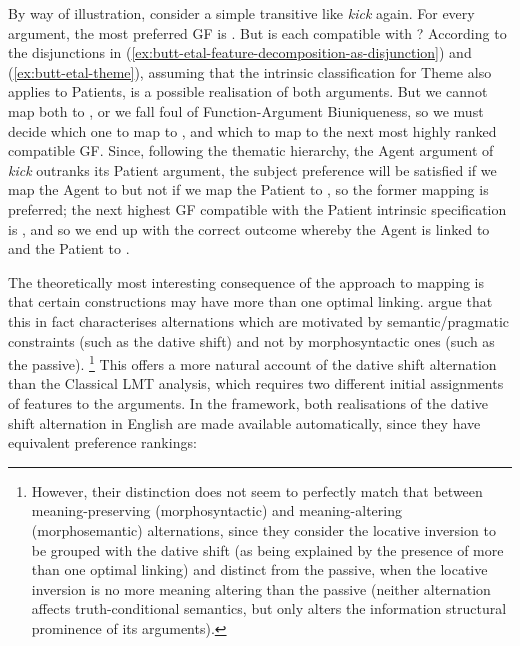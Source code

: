 \documentclass[output=paper]{langscibook}
\begin{document}
By way of illustration, consider a simple transitive like \textit{kick} again.
For every argument, the most preferred GF is \SUBJ. But is each compatible with
\SUBJ? According to the disjunctions in
(\ref{ex:butt-etal-feature-decomposition-as-disjunction}) and
(\ref{ex:butt-etal-theme}), assuming that the intrinsic classification for Theme
also applies to Patients, \SUBJ is a possible realisation of both arguments. But
we cannot map both to \SUBJ, or we fall foul of Function-Argument Biuniqueness,
so we must decide which one to map to \SUBJ, and which to map to the next most
highly ranked compatible GF. Since, following the thematic hierarchy, the Agent
argument of \textit{kick} outranks its Patient argument, the subject preference
will be satisfied if we map the Agent to \SUBJ but not if we map the Patient to
\SUBJ, so the former mapping is preferred; the next highest GF compatible with
the Patient intrinsic specification is \OBJ, and so we end up with the correct
outcome whereby the Agent is linked to \SUBJ and the Patient to \OBJ.

The theoretically most interesting consequence of the
\citet{butt1997architecture} approach to mapping is that certain constructions
may have more than one optimal linking. \citet[8ff.]{butt1997architecture} argue
that this in fact characterises alternations which are motivated by
semantic\slash pragmatic constraints (such as the dative shift) and not by
morphosyntactic ones (such as the passive).%
%
\footnote{However, their distinction does not seem to perfectly match that
  between meaning-preserving (morphosyntactic) and meaning-altering
  (morphosemantic) alternations, since they consider the locative inversion to
  be grouped with the dative shift (as being explained by the presence of more
  than one optimal linking) and distinct from the passive, when the locative
  inversion is no more meaning altering than the passive (neither alternation
  affects truth-conditional semantics, but only alters the information
  structural prominence of its arguments).}
%
This offers a more natural account of the dative shift alternation than the
Classical LMT analysis, which requires two different initial assignments of
features to the arguments. In the \citet{butt1997architecture} framework, both
realisations of the dative shift alternation in English are made available
automatically, since they have equivalent preference rankings:
\end{document}
